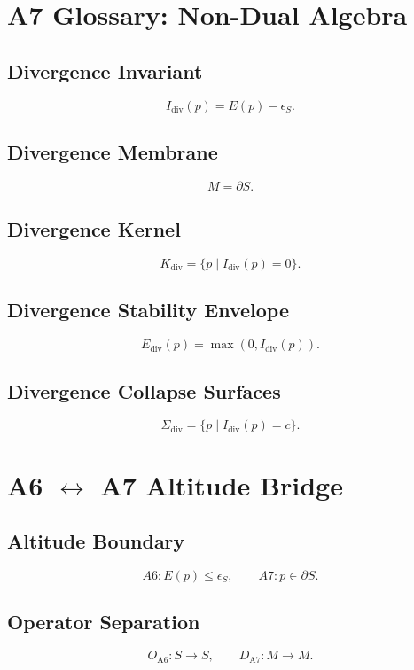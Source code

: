 \documentclass[11pt]{article}
\begin{document}
\section{A7 Glossary: Non-Dual Algebra}

\subsection{Divergence Invariant}
\[
I_{\mathrm{div}}(p) = E(p) - \epsilon_S.
\]

\subsection{Divergence Membrane}
\[
M = \partial S.
\]

\subsection{Divergence Kernel}
\[
K_{\mathrm{div}} = \{ p \mid I_{\mathrm{div}}(p) = 0 \}.
\]

\subsection{Divergence Stability Envelope}
\[
E_{\mathrm{div}}(p) = \max(0, I_{\mathrm{div}}(p)).
\]

\subsection{Divergence Collapse Surfaces}
\[
\Sigma_{\mathrm{div}} = \{ p \mid I_{\mathrm{div}}(p) = c \}.
\]

\section{A6 $\leftrightarrow$ A7 Altitude Bridge}

\subsection{Altitude Boundary}
\[
A6: E(p) \le \epsilon_S,
\qquad
A7: p \in \partial S.
\]

\subsection{Operator Separation}
\[
O_{\mathrm{A6}} : S \to S,
\qquad
D_{\mathrm{A7}} : M \to M.
\]
\end{document}
